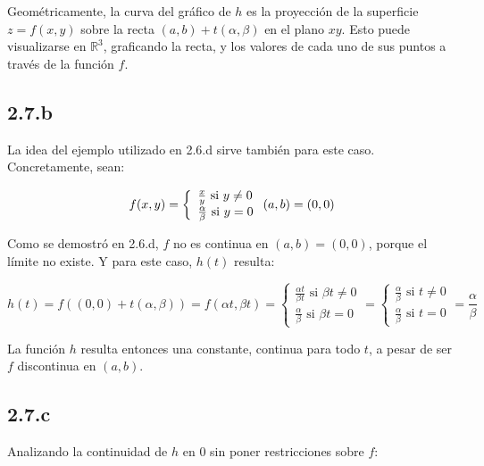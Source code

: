 \documentclass{article}
\renewcommand{\Bbb}{\mathbb}
\begin{document}
Geométricamente, la curva del gráfico de $h$ es la proyección de la superficie $z = f(x,y)$ sobre la recta $(a,b) + t(\alpha,\beta)$ en el plano $xy$. Esto puede visualizarse en $\Bbb R^3$, graficando la recta, y los valores de cada uno de sus puntos a través de la función $f$.

\subsection*{2.7.b}
\label{subsec:2.7.b}

La idea del ejemplo utilizado en 2.6.d sirve también para este caso. Concretamente, sean:

\begin{equation}
f(x,y) = \left\{ \begin{array}{ll}
\frac{x}{y} \text{ si } y \neq 0 \\
\frac{\alpha}{\beta} \text{ si } y = 0
\end{array} \right. \\
(a,b) = (0,0)
\end{equation}

Como se demostró en 2.6.d, $f$ no es continua en $(a,b) = (0,0)$, porque el límite no existe. Y para este caso, $h(t)$ resulta:

\begin{equation}
h(t) = f((0,0) + t(\alpha, \beta)) = f(\alpha t, \beta t) = \left\{ \begin{array}{ll}
\frac{\alpha t}{\beta t} \text{ si } \beta t \neq 0 \\
\frac{\alpha}{\beta} \text{ si } \beta t = 0
\end{array} \right. = \left\{ \begin{array}{ll}
\frac{\alpha}{\beta} \text{ si } t \neq 0 \\
\frac{\alpha}{\beta} \text{ si } t = 0
\end{array} \right. = \frac{\alpha}{\beta}
\end{equation}

La función $h$ resulta entonces una constante, continua para todo $t$, a pesar de ser $f$ discontinua en $(a,b)$.

\subsection*{2.7.c}
\label{subsec:2.7.c}

Analizando la continuidad de $h$ en 0 sin poner restricciones sobre $f$:
\end{document}
